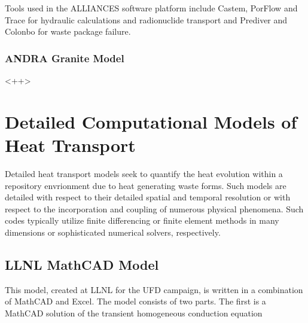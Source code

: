 {Tools used in the ALLIANCES software platform include Castem, PorFlow and Trace
for hydraulic calculations and radionuclide transport and Prediver and Colonbo for
waste package failure.

\subsubsection{ANDRA Granite Model} 

<++>





\section{Detailed Computational Models of Heat Transport}
\label{sec:detailed_heat}


Detailed heat transport models seek to quantify the heat evolution within a 
repository envrionment due to heat generating waste forms. Such models are 
detailed with respect to their detailed spatial and temporal resolution or 
with respect to the incorporation and coupling of numerous physical phenomena. 
Such codes typically utilize finite differencing or finite element methods in 
many dimensions or sophisticated numerical solvers, respectively. 

\subsection{LLNL MathCAD Model}

This model, created at \gls{LLNL} for the \gls{UFD} campaign, is written in a 
combination of MathCAD and Excel. The model consists of two parts. The first is 
a MathCAD solution of the transient homogeneous conduction equation

}

